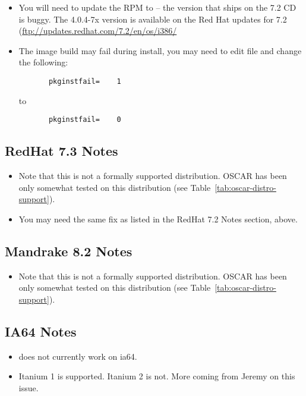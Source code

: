 \begin{itemize}
\item You will need to update the  RPM to
   -- the version that ships on the 7.2 CD is
  buggy.  The 4.0.4-7x version is available on the Red Hat updates for
  7.2 (\url{ftp://updates.redhat.com/7.2/en/os/i386/}
  
\item The image build may fail during install, you may need to edit
  file  and change
  the following:

\begin{verbatim}
       pkginstfail=    1
\end{verbatim}

  to

\begin{verbatim}
       pkginstfail=    0
\end{verbatim}
\end{itemize}


\subsection{RedHat 7.3 Notes}

\begin{itemize}
\item Note that this is not a formally supported distribution.  OSCAR
  \oscarversion has been only somewhat tested on this distribution
  (see Table~\ref{tab:oscar-distro-support}).

\item You may need the same  fix as listed
  in the RedHat 7.2 Notes section, above.
\end{itemize}


\subsection{Mandrake 8.2 Notes}

\begin{itemize}
\item Note that this is not a formally supported distribution.  OSCAR
  \oscarversion has been only somewhat tested on this distribution
  (see Table~\ref{tab:oscar-distro-support}).
\end{itemize}


\subsection{IA64 Notes}

\begin{itemize}
\item {} does not currently work on ia64.

\item Itanium 1 is supported.  Itanium 2 is not.  More coming from
  Jeremy on this issue.
\end{itemize}

